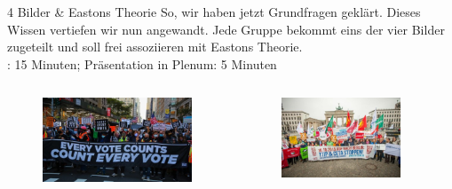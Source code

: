 \documentclass[11pt]{beamer}
\begin{document}
\begin{frame}[t]{4 Bilder \& Eastons Theorie}
So, wir haben jetzt Grundfragen geklärt. Dieses Wissen vertiefen wir nun angewandt. Jede Gruppe bekommt eins der vier Bilder zugeteilt und soll frei assoziieren mit Eastons Theorie. \\
: 15 Minuten; Präsentation in Plenum: 5 Minuten
	\begin{columns}
		\begin{column}{0.25\textwidth}
			\begin{figure}[ht]
				\includegraphics[width=\textwidth]{pics/s2-1.jpg}
			\end{figure}
		\end{column}
		\begin{column}{0.25\textwidth}
			\begin{figure}[ht]
				\includegraphics[width=\textwidth]{pics/s2-2.jpg}
			\end{figure}
		\end{column}
		\begin{column}{0.25\textwidth}

\end{column}
\end{columns}
\end{frame}
\end{document}

